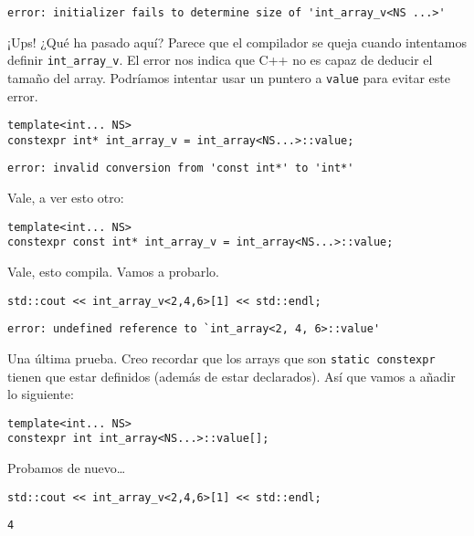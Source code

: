 \documentclass[11pt]{article}
\begin{document}
\begin{verbatim}
error: initializer fails to determine size of 'int_array_v<NS ...>'
\end{verbatim}

¡Ups! ¿Qué ha pasado aquí? Parece que el compilador se queja cuando intentamos definir \texttt{int\_array\_v}. El error nos indica que C++ no es capaz de deducir el tamaño del array. Podríamos intentar usar un puntero a \texttt{value} para evitar este error.

\begin{verbatim}
template<int... NS>
constexpr int* int_array_v = int_array<NS...>::value;
\end{verbatim}

\begin{verbatim}
error: invalid conversion from 'const int*' to 'int*'
\end{verbatim}

Vale, a ver esto otro:

\begin{verbatim}
template<int... NS>
constexpr const int* int_array_v = int_array<NS...>::value;
\end{verbatim}

Vale, esto compila. Vamos a probarlo.

\begin{verbatim}
std::cout << int_array_v<2,4,6>[1] << std::endl;
\end{verbatim}

\begin{verbatim}
error: undefined reference to `int_array<2, 4, 6>::value'
\end{verbatim}

Una última prueba. Creo recordar que los arrays que son \texttt{static constexpr} tienen que estar definidos (además de estar declarados). Así que vamos a añadir lo siguiente:

\begin{verbatim}
template<int... NS>
constexpr int int_array<NS...>::value[];
\end{verbatim}

Probamos de nuevo\ldots{}

\begin{verbatim}
std::cout << int_array_v<2,4,6>[1] << std::endl;
\end{verbatim}

\begin{verbatim}
4
\end{verbatim}
\end{document}

